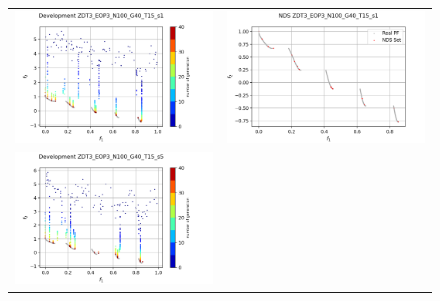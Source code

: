 \begin{figure}[H]
    \centering
    \begin{tabular}{c c}
    \includegraphics[scale=0.5]{figures/ZDT3_EOP3_N100_G40_T15/s1_dev.png} &
    \includegraphics[scale=0.5]{figures/ZDT3_EOP3_N100_G40_T15/s1_nds.png}\\
    \includegraphics[scale=0.5]{figures/ZDT3_EOP3_N100_G40_T15/s5_dev.png} &

\end{tabular}
\end{figure}
